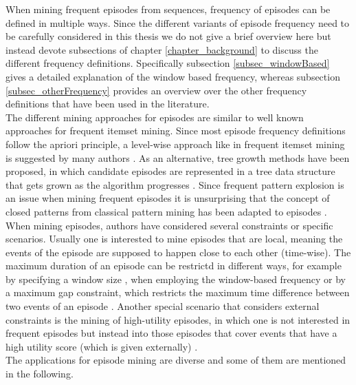 When mining frequent episodes from sequences, frequency of episodes can be defined in multiple ways. Since the different variants of episode frequency need to be carefully considered in this thesis we do not give a brief overview here but instead devote subsections of chapter \ref{chapter_background} to discuss the different frequency definitions. Specifically subsection \ref{subsec_windowBased} gives a detailed explanation of the window based frequency, whereas subsection \ref{subsec_otherFrequency} provides an overview over the other frequency definitions that have been used in the literature. \\
The different mining approaches for episodes are similar to well known approaches for frequent itemset mining. Since most episode frequency definitions follow the apriori principle, a level-wise approach like in frequent itemset mining \cite{agrawal1993mining} is suggested by many authors \cite{mannila1995discovering} \cite{laxman2006discovering}. As an alternative, tree growth methods have been proposed, in which candidate episodes are represented in a tree data structure that gets grown as the algorithm progresses \cite{baumgarten2003tree}. Since frequent pattern explosion is an issue when mining frequent episodes it is unsurprising that the concept of closed patterns from classical pattern mining \cite{wang2003closet+} has been adapted to episodes \cite{zhou2010mining} \cite{tatti2011mining}. \\
When mining episodes, authors have considered several constraints or specific scenarios. Usually one is interested to mine episodes that are local, meaning the events of the episode are supposed to happen close to each other (time-wise). The maximum duration of an episode can be restrictd in different ways, for example by specifying a window size \cite{mannila1995discovering}, when employing the window-based frequency or by a maximum gap constraint, which restricts the maximum time difference between two events of an episode \cite{meger2004constraint}. Another special scenario that considers external constraints is the mining of high-utility episodes, in which one is not interested in frequent episodes but instead into those episodes that cover events that have a high utility score (which is given externally) \cite{wu2013mining}. \\
The applications for episode mining are diverse and some of them are mentioned in the following.

